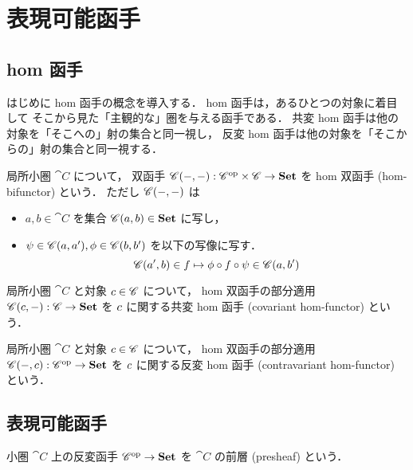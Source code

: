 \documentclass[titlepage]{ltjsreport}
\begin{document}
\chapter{表現可能函手}

\section{hom 函手}

はじめに hom 函手の概念を導入する．
hom 函手は，あるひとつの対象に着目して
そこから見た「主観的な」圏を与える函手である．
共変 hom 函手は他の対象を「そこへの」射の集合と同一視し，
反変 hom 函手は他の対象を「そこからの」射の集合と同一視する．
\begin{definition}
  \def\C{\cat{C}}%
  局所小圏 $\C$ について，
  双函手 $\mrp{\C(-,-)}{\op{\C}\times\C}{\set}$
  を hom 双函手 (hom-bifunctor) という．
  ただし $\mrps{\C}{-}{-}$ は
  \begin{itemize}
    \item $a,b\in\C$ を集合 $\mrps{\C}{a}{b}\in\set$ に写し，
    \item $\psi\in\mrps{\C}{a}{a'},\phi\in\mrps{\C}{b}{b'}$
          を以下の写像に写す．
          \begin{equation}
            \mrps{\C}{a'}{b}\in f\mapsto\phi\circ f\circ\psi\in\mrps{\C}{a}{b'}
          \end{equation}
  \end{itemize}
\end{definition}
\begin{definition}[共変 hom 函手]
  \def\C{\cat{C}}%
  \def\c{\obj{c}}%
  局所小圏 $\C$ と対象 $\c\in\objs{\C}$ について，
  hom 双函手の部分適用 $\mrp{\mrps{\C}{\c}{-}}{\C}{\set}$ を
  $\c$ に関する共変 hom 函手 (covariant hom-functor) という．
\end{definition}
\begin{definition}[反変 hom 函手]
  \def\C{\cat{C}}%
  \def\c{\obj{c}}%
  局所小圏 $\C$ と対象 $\c\in\objs{\C}$ について，
  hom 双函手の部分適用 $\mrp{\mrps{\C}{-}{\c}}{\op{\C}}{\set}$ を
  $\c$ に関する反変 hom 函手 (contravariant hom-functor) という．
\end{definition}

\section{表現可能函手}

\begin{definition}[前層]
  \def\C{\cat{C}}%
  小圏 $\C$ 上の反変函手 $\op{\C}\to\set$ を
  $\C$ の前層 (presheaf) という．
\end{definition}
\end{document}
